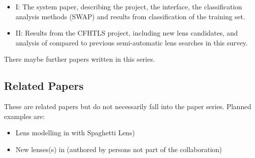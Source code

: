 \documentclass[a4paper]{article}
\begin{document}
\begin{itemize}
% 
%
%
\item \sw I: The system paper, describing the project, the interface, the
classification analysis methods (SWAP) and results from classification of the training set. 
\item \sw II: Results from the CFHTLS project, including new lens candidates, and analysis of \sw compared to previous semi-automatic lens searches in this survey.

\end{itemize}

There maybe further papers written in this series. \newline

\subsection{\sw Related Papers}
These are \sw related papers but do not necessarily fall into the \sw paper series. Planned examples are:
\begin{itemize}
\item Lens modelling in \sw with {\sc Spaghetti Lens})
\item New lenses(s) in \sw (authored by persons not part of the \sw collaboration)
\end{itemize}
\end{document}
